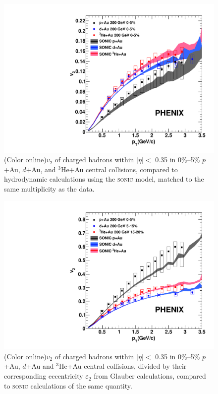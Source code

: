 \documentclass[%
reprint,
showpacs,preprintnumbers,
 amsmath,amssymb,
 aps,
]{revtex4-1}
\newcommand{\dau}{\mbox{$d$+Au}\xspace}
\newcommand{\pau}{\mbox{$p$+Au}\xspace}
\newcommand{\hau}{\mbox{$^3\text{He}$+Au}\xspace}
\begin{document}
\begin{figure}[htbp]
  \includegraphics[scale=0.45]{Figures/figure3.pdf}
  \caption{(Color online)$v_2$ of charged hadrons within $|\eta| <$ 0.35 in 0\%--5\% \pau, \dau, and \hau central collisions, compared to hydrodynamic calculations using the \textsc{sonic} model, matched to the same multiplicity as the data.}
\label{fig:figure3}
\end{figure}

\begin{figure}[htbp]
  \includegraphics[scale=0.45]{Figures/figure4.pdf}
  \caption{(Color online)$v_2$ of charged hadrons within $|\eta| <$ 0.35 in 0\%--5\% \pau, \dau and \hau central collisions, divided by their corresponding eccentricity $\varepsilon_2$ from Glauber calculations, compared to \textsc{sonic} calculations of the same quantity.}
\label{fig:figure4}
\end{figure}
\end{document}
